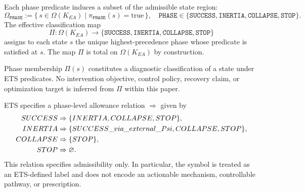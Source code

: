 \begin{definition}
Each phase predicate induces a subset of the admissible state region:
\[
\Omega_{\texttt{PHASE}}
:= \{\, s \in \Omega(K_{EA}) \mid \pi_{\texttt{PHASE}}(s)=\text{true} \,\},
\quad
\texttt{PHASE} \in
\{\texttt{SUCCESS}, \texttt{INERTIA}, \texttt{COLLAPSE}, \texttt{STOP}\}.
\]
The effective classification map
\[
\Pi : \Omega(K_{EA}) \rightarrow
\{\texttt{SUCCESS}, \texttt{INERTIA}, \texttt{COLLAPSE}, \texttt{STOP}\}
\]
assigns to each state $s$ the unique highest-precedence phase whose predicate is
satisfied at $s$. The map $\Pi$ is total on $\Omega(K_{EA})$ by construction.
\end{definition}

\begin{remark}
Phase membership $\Pi(s)$ constitutes a diagnostic classification of a state
under ETS predicates. No intervention objective, control policy, recovery
claim, or optimization target is inferred from $\Pi$ within this paper.
\end{remark}

\begin{definition}
ETS specifies a phase-level allowance relation $\Rightarrow$ given by
\begin{align}
SUCCESS  &\Rightarrow \{INERTIA, COLLAPSE, STOP\}, \\
INERTIA  &\Rightarrow \{SUCCESS\_via\_external\_Psi,
                              COLLAPSE, STOP\}, \\
COLLAPSE &\Rightarrow \{STOP\}, \\
STOP     &\Rightarrow \varnothing .
\end{align}
This relation specifies admissibility only. In particular, the symbol
 is treated as an ETS-defined label and
does not encode an actionable mechanism, controllable pathway, or prescription.
\end{definition}
